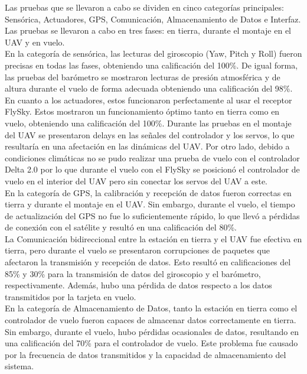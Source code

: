         Las pruebas que se llevaron a cabo se dividen en cinco categorías principales: Sensórica, Actuadores, GPS, Comunicación, Almacenamiento de Datos e Interfaz. Las pruebas se llevaron a cabo en tres fases: en tierra, durante el montaje en el UAV y en vuelo.\\


        En la categoría de sensórica, las lecturas del giroscopio (Yaw, Pitch y Roll) fueron precisas en todas las fases, obteniendo una calificación del 100\%. De igual forma, las pruebas del barómetro se mostraron lecturas de presión atmosférica y de altura durante el vuelo de forma adecuada obteniendo una calificación del 98\%.\\

        En cuanto a los actuadores, estos funcionaron perfectamente al usar el receptor FlySky. Estos mostraron un funcionamiento óptimo tanto en tierra como en vuelo, obteniendo una calificación del 100\%. Durante las pruebas en el montaje del UAV se presentaron delays en las señales del controlador y los servos, lo que resultaría en una afectación en las dinámicas del UAV. Por otro lado, debido a condiciones climáticas no se pudo realizar una prueba de vuelo con el controlador Delta 2.0 por lo que durante el vuelo con el FlySky se posicionó el controlador de vuelo en el interior del UAV pero sin conectar los servos del UAV a este.\\

        En la categoría de GPS, la calibración y recepción de datos fueron correctas en tierra y durante el montaje en el UAV. Sin embargo, durante el vuelo, el tiempo de actualización del GPS no fue lo suficientemente rápido, lo que llevó a pérdidas de conexión con el satélite y resultó en una calificación del 80\%.\\

        La Comunicación bidireccional entre la estación en tierra y el UAV fue efectiva en tierra, pero durante el vuelo se presentaron corrupciones de paquetes que afectaron la transmisión y recepción de datos. Esto resultó en calificaciones del 85\% y 30\% para la transmisión de datos del giroscopio y el barómetro, respectivamente. Además, hubo una pérdida de datos respecto a los datos transmitidos por la tarjeta en vuelo.\\

        En la categoría de Almacenamiento de Datos, tanto la estación en tierra como el controlador de vuelo fueron capaces de almacenar datos correctamente en tierra. Sin embargo, durante el vuelo, hubo pérdidas ocasionales de datos, resultando en una calificación del 70\% para el controlador de vuelo. Este problema fue causado por la frecuencia de datos transmitidos y la capacidad de almacenamiento del sistema.\\

